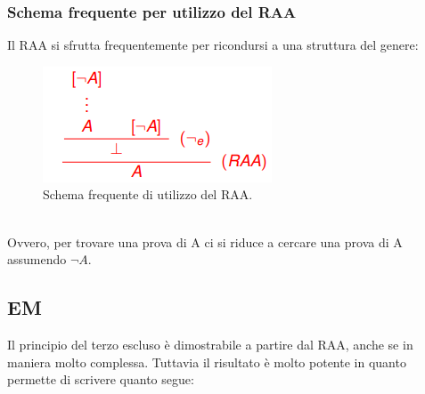 \documentclass[12pt]{article}
\begin{document}
\subsubsection{Schema frequente per utilizzo del RAA}
Il RAA si sfrutta frequentemente per ricondursi a una struttura del genere:
\begin{figure}[!htb]
    \centering
    \includegraphics[width=.9\linewidth,height=.2\textheight,keepaspectratio]{logica_proposizionale/introduzione/RAA_schema.png} %
    \begin{center}
        \caption{\label{fig:RAA_schema}Schema frequente di utilizzo del RAA.} %
    \end{center}
\end{figure}
\\
Ovvero, per trovare una prova di A ci si riduce a cercare una prova di A assumendo $\neg A$.

\subsection{EM}
\label{ssec:EM}
Il principio del terzo escluso è dimostrabile a partire dal RAA, anche se in maniera molto complessa. Tuttavia il risultato è molto potente in quanto permette di scrivere quanto segue:
\end{document}
